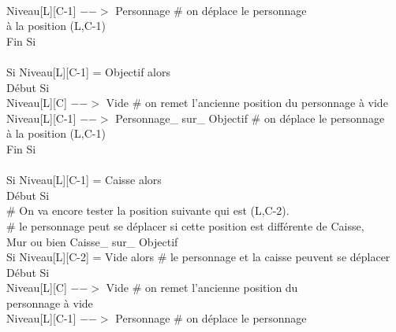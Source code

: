 \documentclass{article}
\begin{document}
\begin{tabbing}
\\	\hspace{4cm}		Niveau[L][C-1] $-->$ Personnage	\# on déplace le personnage 
\\ \hspace{4cm} à la position (L,C-1)
\\	\hspace{3cm}	Fin Si 
\\		
\\	\hspace{3cm} Si Niveau[L][C-1] = Objectif alors			
\\	\hspace{3cm}	Début Si
\\	\hspace{4cm}		Niveau[L][C] $-->$ Vide 				\# on remet l'ancienne position du personnage à vide
\\	\hspace{4cm}		Niveau[L][C-1] $-->$ Personnage\_ sur\_ Objectif	\# on déplace le personnage
\\ \hspace{4cm} à la position (L,C-1)
\\	\hspace{3cm}	Fin Si 
\\		
\\	\hspace{3cm}	Si Niveau[L][C-1] = Caisse alors			
\\	\hspace{3cm}	Début Si
\\	\hspace{4cm}		\# On va encore tester la position suivante qui est (L,C-2). 
\\	\hspace{4cm}		\# le personnage peut se déplacer si cette position est différente de Caisse,
\\ \hspace{4cm} Mur ou bien Caisse\_ sur\_ Objectif
\\	\hspace{4cm}		Si Niveau[L][C-2] = Vide alors          \# le personnage et la caisse peuvent se déplacer
\\	\hspace{4cm}		Début Si
\\	\hspace{5cm}			Niveau[L][C] $-->$ Vide 		\# on remet l'ancienne position du 
\\ \hspace{5cm} personnage à vide
\\	\hspace{5cm}			Niveau[L][C-1] $-->$ Personnage	\# on déplace le personnage 

\end{tabbing}
\end{document}
